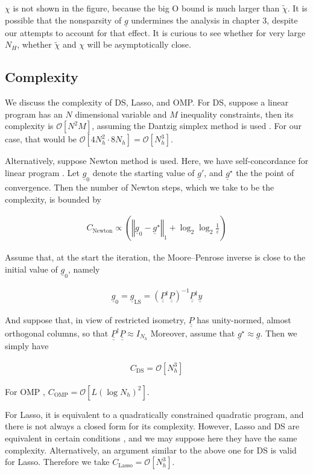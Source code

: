 \documentclass[journal]{IEEEtran}
\newcommand {\e} {\varepsilon}
\newcommand {\D} {\cdot}
\newcommand {\m} [1] {\( #1 \)}
\newcommand {\V} [1] {\underline {#1}}
\newcommand {\M} [1] {\underline {\underline {#1}}}
\newcommand {\RB} [1] {\left( #1 \right)}
\newcommand {\SB} [1] {\left[ #1 \right]}
\newcommand {\VNm} [1] {\left \Vert #1 \right \Vert}
\newcommand {\Disp} [1] {
   \begin {align*}
      #1
   \end {align*}
}
\begin{document}
\m {\chi} is not shown in the figure, because the big O bound is much larger than \m {\tilde {\chi}}.
It is possible that the nonsparsity of \m {\V {g}} undermines the analysis in chapter 3, despite our attempts to account for that effect.
It is curious to see whether for very large \m {N_H}, whether \m {\tilde {\chi}} and \m {\chi} will be asymptotically close.

\subsection {Complexity}

We discuss the complexity of DS, Lasso, and OMP.
For DS, suppose a linear program has an \m {N} dimensional variable and \m {M} inequality constraints, then its complexity is \m {\mathcal {O} \SB {N^2 M}}, assuming the Dantzig simplex method is used \cite {BoV04}.
For our case, that would be \m {\mathcal {O} \SB {4 N_h ^2 \D 8 N_h} = \mathcal {O} \SB {N_h ^3}}.

Alternatively, suppose Newton method is used.
Here, we have self-concordance for linear program \cite {BoV04}.
Let \m {\V {g} _0} denote the starting value of \m {\V {g}'}, and \m {\V {g} ^{\star}} the the point of convergence.
Then the number of Newton steps, which we take to be the complexity, is bounded by \cite {BoV04}
\Disp {
C_{\mathrm {Newton}}
\propto \RB {\VNm {\V {g}_0 -\V {g} ^{\star}}_1
+ \log_2 \log_2 \frac {1} {\e}}
}

Assume that, at the start the iteration, the Moore–Penrose inverse is close to the initial value of \m {\V {g}_0}, namely
%
\Disp {
\V {g}_0
=\V {g}_{\mathrm {LS}}
= \RB {\M {P} ^\dagger \M {P}} ^{-1} \M {P} ^\dagger \V {y} 
}
And suppose that, in view of restricted isometry, \m {\M {P}} has unity-normed, almost orthogonal columns, so that
\m {\M {P} ^\dagger \M {P} \approx I _{N_h}}
Moreover, assume that \m {\V {g} ^\star \approx \V {g}}.
Then we simply have
\Disp {
C_{\mathrm {DS}}
=\mathcal {O} \SB {N_h ^3} 
}

For OMP \cite {TrG07}, \m {C_{\mathrm {OMP}} =\mathcal {O} \SB {L \RB {\log N_h} ^2}}.

For Lasso, it is equivalent to a quadratically constrained quadratic program, and there is not always a closed form for its complexity.
However, Lasso and DS are equivalent in certain conditions \cite {AsR10}, and we may suppose here they have the same complexity.
Alternatively, an argument similar to the above one for DS is valid for Lasso.
Therefore we take \m {C_{\mathrm {Lasso}} =\mathcal {O} \SB {N_h ^3}}.
\end{document}
